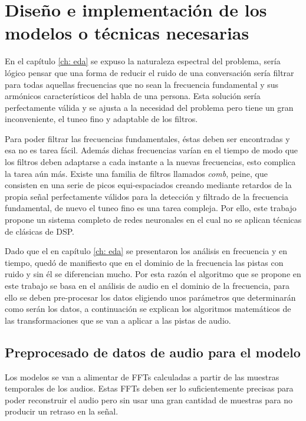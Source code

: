 \chapter{Diseño e implementación de los modelos o técnicas necesarias}\label{cp: modelDesign}
En el capítulo \ref{ch: eda} se expuso la naturaleza espectral del problema, sería lógico pensar que una forma de reducir el ruido de una conversación sería filtrar para todas aquellas frecuencias que no sean la frecuencia fundamental y sus armónicos característicos del habla de una persona. Esta solución sería perfectamente válida y se ajusta a la necesidad del problema pero tiene un gran inconveniente, el tuneo fino y adaptable de los filtros.

Para poder filtrar las frecuencias fundamentales, éstas deben ser encontradas y esa no es tarea fácil. Además dichas frecuencias varían en el tiempo de modo que los filtros deben adaptarse a cada instante a la nuevas frecuencias, esto complica la tarea aún más. Existe una familia de filtros llamados \textit{comb}, peine, que consisten en una serie de picos equi-espaciados creando mediante retardos de la propia señal perfectamente válidos para la detección y filtrado de la frecuencia fundamental\cite{1035730}, de nuevo el tuneo fino es una tarea compleja. Por ello, este trabajo propone un sistema completo de redes neuronales en el cual no se aplican técnicas de clásicas de \gls{DSP}.

Dado que el en capítulo \ref{ch: eda} se presentaron los análisis en frecuencia y en tiempo, quedó de manifiesto que en el dominio de la frecuencia las pistas con ruido y sin él se diferencian mucho. Por esta razón el algoritmo que se propone en este trabajo se basa en el análisis de audio en el dominio de la frecuencia, para ello se deben pre-procesar los datos eligiendo unos parámetros que determinarán como serán los datos, a continuación se explican los algoritmos matemáticos de las transformaciones que se van a aplicar a las pistas de audio.

\section{Preprocesado de datos de audio para el modelo}
Los modelos se van a alimentar de \glspl{FFT} calculadas a partir de las muestras temporales de los audios. Estas \glspl{FFT} deben ser lo suficientemente precisas para poder reconstruir el audio pero sin usar una gran cantidad de muestras para no producir un retraso en la señal.

